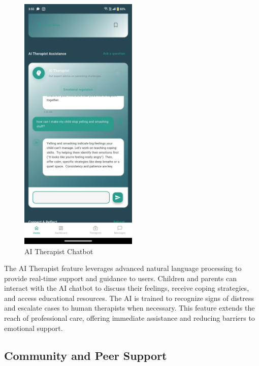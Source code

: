 \documentclass[12pt,a4paper]{article}
\newcommand{\sectiontitle}[1]{\subsection{#1}}
\begin{document}
\begin{figure}[H]
    \centering
    \includegraphics[width=0.5\textwidth]{Screenshots/aitherapist.png}
    \caption{AI Therapist Chatbot}
    \label{fig:ai-therapist}
\end{figure}
The AI Therapist feature leverages advanced natural language processing to provide real-time support and guidance to users. Children and parents can interact with the AI chatbot to discuss their feelings, receive coping strategies, and access educational resources. The AI is trained to recognize signs of distress and escalate cases to human therapists when necessary. This feature extends the reach of professional care, offering immediate assistance and reducing barriers to emotional support.

\sectiontitle{Community and Peer Support}
\end{document}
